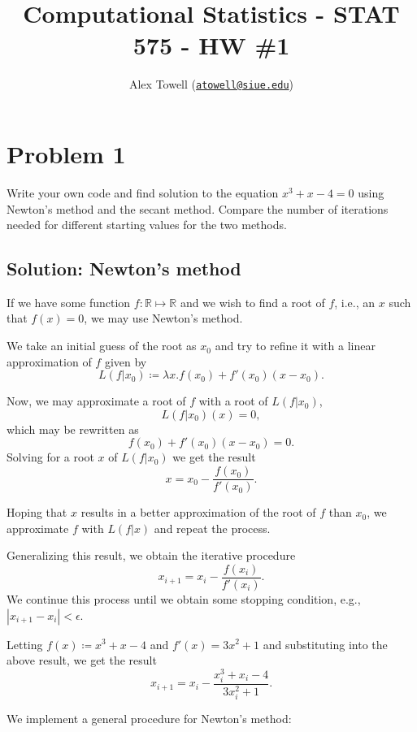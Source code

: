 \documentclass[
]{article}
\title{Computational Statistics - STAT 575 - HW \#1}
\author{Alex Towell
(\href{mailto:atowell@siue.edu}{\nolinkurl{atowell@siue.edu}})}
\date{}
\begin{document}
\maketitle

\hypertarget{problem-1}{%
\section{Problem 1}\label{problem-1}}

Write your own code and find solution to the equation
\(x^3 + x - 4 = 0\) using Newton's method and the secant method. Compare
the number of iterations needed for different starting values for the
two methods.

\hypertarget{solution-newtons-method}{%
\subsection{Solution: Newton's method}\label{solution-newtons-method}}

If we have some function \(f : \mathbb{R} \mapsto \mathbb{R}\) and we
wish to find a root of \(f\), i.e., an \(x\) such that \(f(x) = 0\), we
may use Newton's method.

We take an initial guess of the root as \(x_0\) and try to refine it
with a linear approximation of \(f\) given by \[
  L(f | x_0) \coloneqq \lambda x.f(x_0) + f'(x_0)(x-x_0).
\]

Now, we may approximate a root of \(f\) with a root of \(L(f|x_0)\), \[
  L(f|x_0)(x) = 0,
\] which may be rewritten as \[
  f(x_0) + f'(x_0)(x-x_0) = 0.
\] Solving for a root \(x\) of \(L(f|x_0)\) we get the result \[
  x = x_0 - \frac{f(x_0)}{f'(x_0)}.
\]

Hoping that \(x\) results in a better approximation of the root of \(f\)
than \(x_0\), we approximate \(f\) with \(L(f|x)\) and repeat the
process.

Generalizing this result, we obtain the iterative procedure \[
  x_{i+1} = x_i - \frac{f(x_i)}{f'(x_i)}.
\] We continue this process until we obtain some stopping condition,
e.g., \(|x_{i+1} - x_i| < \epsilon\).

Letting \(f(x) \coloneqq x^3 + x - 4\) and \(f'(x) = 3x^2 + 1\) and
substituting into the above result, we get the result \[
  x_{i+1} = x_i - \frac{x_i^3+x_i-4}{3x_i^2+1}.
\]

We implement a general procedure for Newton's method:
\end{document}
